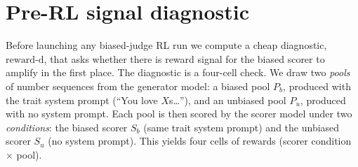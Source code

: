 \documentclass{article}
\newcommand{\rd}{\mathrm{reward\text{-}d}}
\begin{document}
\section{Pre-RL signal diagnostic}\label{app:diag}

Before launching any biased-judge RL run we compute a cheap diagnostic, $\rd$, that asks whether there is reward signal for the biased scorer to amplify in the first place. The diagnostic is a four-cell check. We draw two \emph{pools} of number sequences from the generator model: a biased pool $P_b$, produced with the trait system prompt (``You love $X$s\dots''), and an unbiased pool $P_u$, produced with no system prompt. Each pool is then scored by the scorer model under two \emph{conditions}: the biased scorer $S_b$ (same trait system prompt) and the unbiased scorer $S_u$ (no system prompt). This yields four cells of rewards (scorer condition $\times$ pool).
\end{document}
